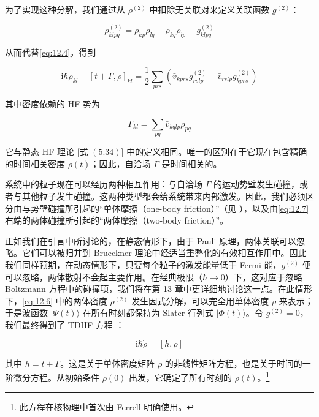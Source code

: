 为了实现这种分解，我们通过从 $\rho^{(2)}$ 中扣除无关联对来定义关联函数 $g^{(2)}$：

\begin{equation}
\rho^{(2)}_{klpq}=\rho_{kp}\rho_{lq}-\rho_{kq}\rho_{lp}+g^{(2)}_{klpq}\label{eq:12.6}
\end{equation}

从而代替\ref{eq:12.4}，得到

\begin{equation}
\mathrm{i}\hbar\dot{\rho}_{kl}-[t+\Gamma,\rho]_{kl}=\frac{1}{2}\sum_{prs}(\bar{v}_{kprs}g^{(2)}_{rslp}-\bar{v}_{rslp}g^{(2)}_{kprs})\label{eq:12.7}
\end{equation}

其中密度依赖的 HF 势为

\begin{equation}
\Gamma_{kl}=\sum_{pq}\bar{v}_{kqlp}\rho_{pq}\label{eq:12.8}
\end{equation}

它与静态 HF 理论 {[}式 $(5.34)${]} 中的定义相同。唯一的区别在于它现在包含精确的时间相关密度 $\rho(t)$；因此，自洽场
$\Gamma$ 是时间相关的。

系统中的粒子现在可以经历两种相互作用：与自洽场 $\Gamma$ 的运动势壁发生碰撞，或者与其他粒子发生碰撞。这两种类型都会给系统带来内部激发。因此，我们必须区分由与势壁碰撞所引起的“单体摩擦（one-body
friction）”（见 \cite{MSK77}），以及由\ref{eq:12.7} 右端的两体碰撞所引起的“两体摩擦（two-body
friction）”。

正如我们在引言中所讨论的，在静态情形下，由于 Pauli 原理，两体关联可以忽略。它们可以被归并到 Brueckner 理论中经适当重整化的有效相互作用中。因此我们同样预期，在动态情形下，只要每个粒子的激发能量低于
Fermi 能，$g^{(2)}$ 便可以忽略，两体散射不会起主要作用。在经典极限（$\hbar\to0$）下，这对应于忽略 Boltzmann
方程中的碰撞项，我们将在第 13 章中更详细地讨论这一点。在此情形下，\ref{eq:12.6} 中的两体密度 $\rho^{(2)}$
发生因式分解，可以完全用单体密度 $\rho$ 来表示；于是波函数 $|\Psi(t)\rangle$ 在所有时刻都保持为 Slater
行列式 $|\Phi(t)\rangle$。令 $g^{(2)}=0$，我们最终得到了 TDHF 方程 \cite{Di30}：

\begin{equation}
\mathrm{i}\hbar\dot{\rho}=[h,\rho]\label{eq:12.9}
\end{equation}

其中 $h=t+\Gamma$。这是关于单体密度矩阵 $\rho$ 的非线性矩阵方程，也是关于时间的一阶微分方程。从初始条件 $\rho(0)$
出发，它确定了所有时刻的 $\rho(t)$。\footnote{此方程在核物理中首次由 Ferrell \cite{Fe57} 明确使用。}

